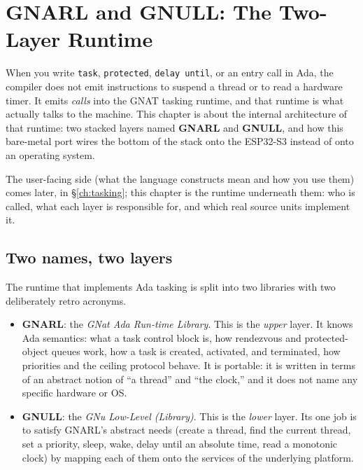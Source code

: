 \chapter{GNARL and GNULL: The Two-Layer Runtime}
\label{ch:gnarl-gnull}

When you write \texttt{task}, \texttt{protected}, \texttt{delay until}, or an entry
call in Ada, the compiler does not emit instructions to suspend a thread or to
read a hardware timer. It emits \emph{calls} into the GNAT tasking runtime, and
that runtime is what actually talks to the machine. This chapter is about the
internal architecture of that runtime: two stacked layers named \textbf{GNARL}
and \textbf{GNULL}, and how this bare-metal port wires the bottom of the stack
onto the ESP32-S3 instead of onto an operating system.

The user-facing side (what the language constructs mean and how you use them)
comes later, in \S\ref{ch:tasking}; this chapter is the runtime underneath
them: who is called, what each layer is responsible for, and which real source
units implement it.

\section{Two names, two layers}

The runtime that implements Ada tasking is split into two libraries with two
deliberately retro acronyms.

\begin{itemize}
  \item \textbf{GNARL}: the \emph{GNat Ada Run-time Library}. This is the
        \emph{upper} layer. It knows Ada semantics: what a task control block is,
        how rendezvous and protected-object queues work, how a task is created,
        activated, and terminated, how priorities and the ceiling protocol
        behave. It is portable: it is written in terms of an abstract notion of
        ``a thread'' and ``the clock,'' and it does not name any specific
        hardware or OS.
  \item \textbf{GNULL}: the \emph{GNu Low-Level (Library)}. This is the
        \emph{lower} layer. Its one job is to satisfy GNARL's abstract needs
        (create a thread, find the current thread, set a priority, sleep, wake,
        delay until an absolute time, read a monotonic clock) by mapping each
        of them onto the services of the underlying platform.
\end{itemize}

